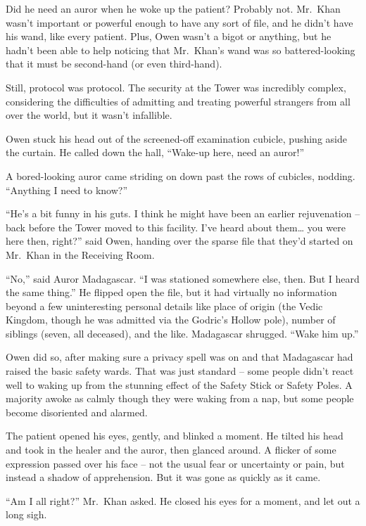 Did he need an auror when he woke up the patient? Probably not. Mr.~Khan
wasn't important or powerful enough to have any sort of file, and he
didn't have his wand, like every patient. Plus, Owen wasn't a bigot or
anything, but he hadn't been able to help noticing that Mr.~Khan's wand
was so battered-looking that it must be second-hand (or even
third-hand).

Still, protocol was protocol. The security at the Tower was incredibly
complex, considering the difficulties of admitting and treating powerful
strangers from all over the world, but it wasn't infallible.

Owen stuck his head out of the screened-off examination cubicle, pushing
aside the curtain. He called down the hall, ``Wake-up here, need an
auror!''

A bored-looking auror came striding on down past the rows of cubicles,
nodding. ``Anything I need to know?''

``He's a bit funny in his guts. I think he might have been an earlier
rejuvenation -- back before the Tower moved to this facility. I've heard
about them\ldots{} you were here then, right?'' said Owen, handing over
the sparse file that they'd started on Mr.~Khan in the Receiving Room.

``No,'' said Auror Madagascar. ``I was stationed somewhere else, then.
But I heard the same thing.'' He flipped open the file, but it had
virtually no information beyond a few uninteresting personal details
like place of origin (the Vedic Kingdom, though he was admitted via the
Godric's Hollow pole), number of siblings (seven, all deceased), and the
like. Madagascar shrugged. ``Wake him up.''

Owen did so, after making sure a privacy spell was on and that
Madagascar had raised the basic safety wards. That was just standard --
some people didn't react well to waking up from the stunning effect of
the Safety Stick or Safety Poles. A majority awoke as calmly though they
were waking from a nap, but some people become disoriented and alarmed.

The patient opened his eyes, gently, and blinked a moment. He tilted his
head and took in the healer and the auror, then glanced around. A
flicker of some expression passed over his face -- not the usual fear or
uncertainty or pain, but instead a shadow of apprehension. But it was
gone as quickly as it came.

``Am I all right?'' Mr.~Khan asked. He closed his eyes for a moment, and
let out a long sigh.

